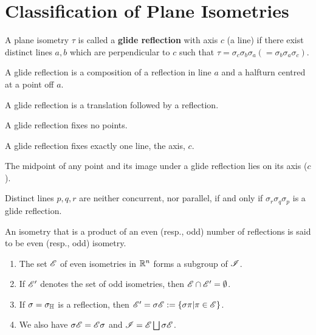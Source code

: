 \section{Classification of Plane Isometries}

\begin{definition}
    A plane isometry \(\tau\) is called a \textbf{glide reflection} with axis \(c\) (a line) if there exist distinct lines \(a, b\) which are perpendicular to \(c\) such that \(\tau = \sigma_c \sigma_b \sigma_a (= \sigma_b  \sigma_a \sigma_c)\).
\end{definition}

\begin{proposition}
    \begin{statements}{}
        \item A glide reflection is a composition of a reflection in line \(a\) and a halfturn centred at a point off \(a\).
        \item A glide reflection is a translation followed by a reflection.
        \item A glide reflection fixes no points.
        \item A glide reflection fixes exactly one line, the axis, \(c\).
        \item The midpoint of any point and its image under a glide reflection lies on its axis (\(c\)).
    \end{statements}
\end{proposition}

\begin{theorem}
    Distinct lines \(p, q, r\) are neither concurrent, nor parallel, if and only if \(\sigma_r \sigma_q \sigma_p\) is a glide reflection.
\end{theorem}

\begin{definition}
    An isometry that is a product of an even (resp., odd) number of reflections is said to be even (resp., odd) isometry.
\end{definition}

\begin{theorem}
    \begin{enumerate}
        \item The set \(\mathscr{E}\) of even isometries in \(\mathbb{R}^n\) forms a subgroup of \(\mathscr{I}\).
        \item If \(\mathscr{E}'\) denotes the set of odd isometries, then \(\mathscr{E} \cap \mathscr{E}' = \emptyset\).
        \item If \(\sigma = \sigma_{\mathbb{H}}\) is a reflection, then \(\mathscr{E}' = \sigma \mathscr{E} := \{ \sigma \pi | \pi \in \mathscr{E}\}\).
        \item We also have \(\sigma \mathscr{E} = \mathscr{E} \sigma\) and \(\mathscr{I} = \mathscr{E} \bigsqcup \sigma\mathscr{E}\).
    \end{enumerate}
\end{theorem}

